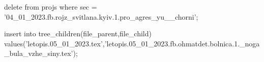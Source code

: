  
 
 
 
 

delete from projs where sec = '04_01_2023.fb.rojz_svitlana.kyiv.1.pro_agres_yu__chorni';

insert into tree_children(file_parent,file_child) values('letopis.05_01_2023.tex','letopis.05_01_2023.fb.ohmatdet.bolnica.1._noga_bula_vzhe_siny.tex');
